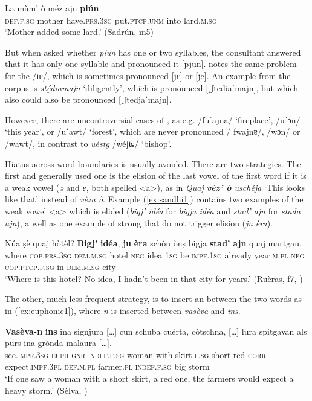 \ea\label{ex:lard}
\gll La mùm' ò méz ajn \textbf{piún}.\\
\textsc{def.f.sg} mother have.\textsc{prs.3sg} put.\textsc{ptcp.unm} into lard.\textsc{m.sg}\\
\glt `Mother added some lard.' (Sadrún, m5)
\z

But when asked whether \textit{piun} has one or two syllables, the consultant answered that it has only one syllable and pronounced it [pjun]. \citet[3f.]{Caduff1952} notes the same problem for the  /iɐ/, which is sometimes pronounced [jɛ] or [je]. An example from the corpus is \textit{sté̱diamajn} `diligently', which is pronounced [ˌʃtediaˈmajn], but which also could also be pronounced [ˌʃtedjaˈmajn].

However, there are uncontroversial cases of , as e.g. /fuˈajna/ `fireplace', /uˈɔn/ `this year', or /uˈawt/ `forest', which are never pronounced /ˈfwajnɐ/, /wɔn/ or /wawt/, in contrast to \textit{uéstg} /wéʃʨ/ `bishop'.

Hiatus across word boundaries is usually avoided. There are two strategies. The first and generally used one is the elision of the last vowel of the first word if it is a weak vowel (\textit{ə} and \textit{ɐ}, both spelled <a>), as in \textit{Quaj \textbf{vèz' ò} uschéja} `This looks like that' instead of \textit{vèza ò}. Example (\ref{ex:sandhi1}) contains two examples of the weak vowel <a> which is elided (\textit{bigj' idéa} for \textit{bigja idéa} and \textit{stad' ajn} for \textit{stada ajn}), a well as one example of strong  that do not trigger elision (\textit{ju èra}).

\ea
\label{ex:sandhi1}
\gll Núa ṣè quaj hòtè̱l? \textbf{Bigj'} \textbf{idéa}, \textbf{ju} \textbf{èra} schòn ònṣ bigja \textbf{stad’} \textbf{ajn} quaj martgau.   \\
where \textsc{cop.prs.3sg} \textsc{dem.m.sg} hotel \textsc{neg} idea \textsc{1sg} be.\textsc{impf.1sg} already year.\textsc{m.pl} \textsc{neg} \textsc{cop.ptcp.f.sg} in \textsc{dem.m.sg} city\\
\glt `Where is this hotel? No idea, I hadn't been in that city for years.' (Ruèras, f7,  )
\z

The other, much less frequent strategy, is to insert an  between the two words as in (\ref{ex:euphonic1}), where \textit{n} is inserted between \textit{vasèva} and \textit{ins}.

\ea
\label{ex:euphonic1}
\gll    \textbf{Vasèva-n} \textbf{ins} ina signjura […] cun schuba cuérta, còtschna, […] lura spitgavan als purs ina grònda malaura […].\\
see.\textsc{impf.3sg-euph} \textsc{gnr} \textsc{indef.f.sg} woman {} with skirt.\textsc{f.sg} short red {} \textsc{corr} expect.\textsc{impf.3pl} \textsc{def.m.pl} farmer.\textsc{pl} \textsc{indef.f.sg} big storm\\
\glt `If one saw a woman with a short skirt, a red one, the farmers would expect a heavy storm.' (Sèlva, \citealt[34]{Büchli1966})
\z

